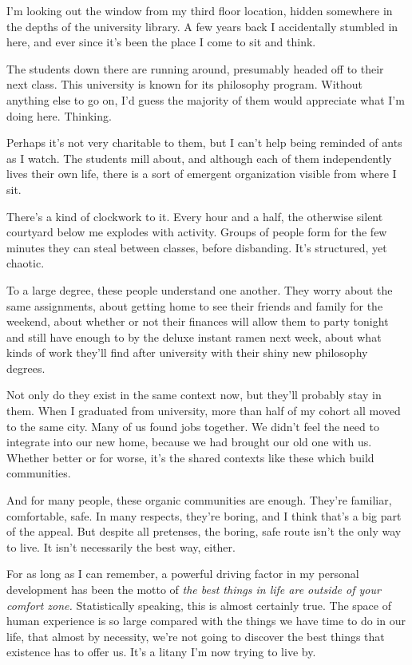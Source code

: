 \documentclass[]{book}
\begin{document}
\qquad

\qquad

I'm looking out the window from my third floor location, hidden somewhere in the
depths of the university library. A few years back I accidentally stumbled in
here, and ever since it's been the place I come to sit and think.

The students down there are running around, presumably headed off to their next
class. This university is known for its philosophy program. Without anything
else to go on, I'd guess the majority of them would appreciate what I'm doing
here. Thinking.

Perhaps it's not very charitable to them, but I can't help being reminded of
ants as I watch. The students mill about, and although each of them
independently lives their own life, there is a sort of emergent organization
visible from where I sit.

There's a kind of clockwork to it. Every hour and a half, the otherwise silent
courtyard below me explodes with activity. Groups of people form for the few
minutes they can steal between classes, before disbanding. It's structured, yet
chaotic.

To a large degree, these people understand one another. They worry about the
same assignments, about getting home to see their friends and family for the
weekend, about whether or not their finances will allow them to party tonight
and still have enough to by the deluxe instant ramen next week, about what kinds
of work they'll find after university with their shiny new philosophy degrees.

Not only do they exist in the same context now, but they'll probably stay in
them. When I graduated from university, more than half of my cohort all moved to
the same city. Many of us found jobs together. We didn't feel the need to
integrate into our new home, because we had brought our old one with us. Whether
better or for worse, it's the shared contexts like these which build
communities.

And for many people, these organic communities are enough. They're familiar,
comfortable, safe. In many respects, they're boring, and I think that's a big
part of the appeal. But despite all pretenses, the boring, safe route isn't the
only way to live. It isn't necessarily the best way, either.

For as long as I can remember, a powerful driving factor in my personal
development has been the motto of \emph{the best things in life are outside of
your comfort zone.} Statistically speaking, this is almost certainly true. The
space of human experience is so large compared with the things we have time to
do in our life, that almost by necessity, we're not going to discover the best
things that existence has to offer us. It's a litany I'm now trying to live by.
\end{document}
